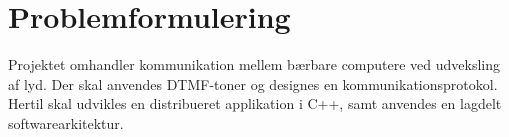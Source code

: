\section{Problemformulering}

Projektet omhandler kommunikation mellem bærbare computere ved udveksling af lyd. Der skal anvendes DTMF-toner og designes en kommunikationsprotokol. Hertil skal udvikles en distribueret applikation i C++, samt anvendes en lagdelt softwarearkitektur.

